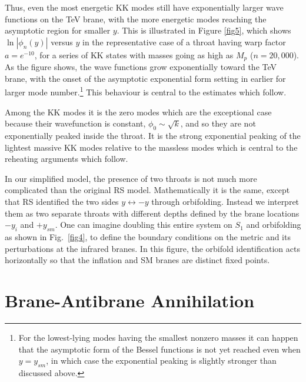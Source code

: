 \documentclass[12pt]{JHEP3}
\begin{document}
Thus, even the most energetic KK modes still have exponentially
larger wave functions on the TeV brane, with the more energetic
modes reaching the asymptotic region for smaller $y$. This is
illustrated in Figure \ref{fig5}, which shows $\ln|\phi_n(y)|$
versus $y$ in the representative case of a throat having warp
factor $a = e^{-10}$, for a series of KK states with masses going
as high as $M_p$ ($n=20,000$). As the figure shows, the wave
functions grow exponentially toward the TeV brane, with the onset
of the asymptotic exponential form setting in earlier for larger
mode number.\footnote{For the lowest-lying modes having the
smallest nonzero masses it can happen that the asymptotic form of
the Bessel functions is not yet reached even when $y = y_{sm}$, in
which case the exponential peaking is slightly stronger than
discussed above.} This behaviour is central to the estimates which
follow.

Among the KK modes it is the zero modes which are the exceptional
case because their wavefunction is constant, $\phi_0 \sim
\sqrt{k}$, and so they are not exponentially peaked inside the
throat. It is the strong exponential peaking of the lightest
massive KK modes relative to the massless modes which is central
to the reheating arguments which follow.



In our simplified model, the presence of two throats is not much
more complicated than the original RS model.  Mathematically it is
the same, except that RS identified the two sides
$y\leftrightarrow -y$ through orbifolding.  Instead we interpret
them as two separate throats with different depths defined by the
brane locations $-y_i$ and $+y_{sm}$.  One can imagine doubling
this entire system on $S_1$ and orbifolding as shown in
Fig.~\ref{fig4}, to define the boundary conditions on the metric
and its perturbations at the infrared branes. In this figure, the
orbifold identification acts horizontally so that the inflation
and SM branes are distinct fixed points.

\section{Brane-Antibrane Annihilation}
\end{document}
